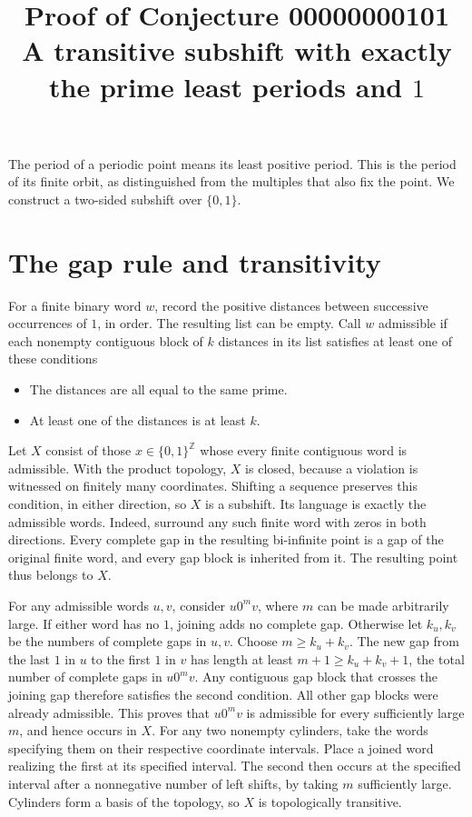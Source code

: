 \documentclass[11pt]{article}
\title{Proof of Conjecture 00000000101\\
\large A transitive subshift with exactly the prime least periods and \(1\)}
\author{}
\date{}
\begin{document}
\maketitle

The period of a periodic point means its least positive period. This is
the period of its finite orbit, as distinguished from the multiples that
also fix the point. We construct a two-sided subshift over \(\{0,1\}\).

\section*{The gap rule and transitivity}

For a finite binary word \(w\), record the positive distances between
successive occurrences of \(1\), in order. The resulting list can be
empty. Call \(w\) admissible if each nonempty contiguous block of \(k\)
distances in its list satisfies at least one of these conditions
\begin{itemize}
  \item The distances are all equal to the same prime.
  \item At least one of the distances is at least \(k\).
\end{itemize}
Let \(X\) consist of those \(x\in\{0,1\}^{\mathbb Z}\) whose every finite
contiguous word is admissible. With the product topology, \(X\) is
closed, because a violation is witnessed on finitely many coordinates.
Shifting a sequence preserves this condition, in either direction,
so \(X\) is a subshift. Its language is exactly the admissible words.
Indeed, surround any such finite word with zeros in both directions.
Every complete gap in the resulting bi-infinite point is a gap of
the original finite word, and every gap block is inherited from it.
The resulting point thus belongs to \(X\).

For any admissible words \(u,v\), consider \(u0^m v\), where \(m\) can
be made arbitrarily large. If either word has no \(1\), joining adds
no complete gap. Otherwise let \(k_u,k_v\) be the numbers of complete
gaps in \(u,v\). Choose \(m\ge k_u+k_v\). The new gap from the last
\(1\) in \(u\) to the first \(1\) in \(v\) has length at least
\(m+1\ge k_u+k_v+1\), the total number of complete gaps in
\(u0^m v\). Any contiguous gap block that crosses the joining gap
therefore satisfies the second condition. All other gap blocks were
already admissible. This proves that \(u0^m v\) is admissible for
every sufficiently large \(m\), and hence occurs in \(X\).
For any two nonempty cylinders, take the words specifying them
on their respective coordinate intervals. Place a joined word
realizing the first at its specified interval. The second then occurs
at the specified interval after a nonnegative number of left shifts,
by taking \(m\) sufficiently large. Cylinders form a basis of the
topology, so \(X\) is topologically transitive.
\end{document}
